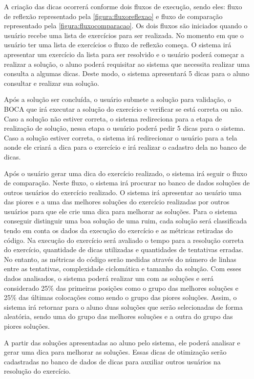 A criação das dicas ocorrerá conforme dois fluxos de execução, sendo eles: fluxo de reflexão representado pela \cref{figura:fluxoreflexao} e fluxo de comparação representado pela \cref{figura:fluxocomparacao}. Os dois fluxos são iniciados quando o usuário recebe uma lista de exercícios para ser realizada. No momento em que o usuário ter uma lista de exercícios o fluxo de reflexão começa. O sistema irá apresentar um exercício da lista para ser resolvido e o usuário poderá começar a realizar a solução, o aluno poderá requisitar ao sistema que necessita realizar uma consulta a algumas dicas. Deste modo, o sistema apresentará 5 dicas para o aluno consultar e realizar sua solução.

Após a solução ser concluída, o usuário submete a solução para validação, o BOCA que irá executar a solução do exercício e verificar se está correta ou não. Caso a solução não estiver correta, o sistema redireciona para a etapa de realização de solução, nessa etapa o usuário poderá pedir 5 dicas para o sistema. Caso a solução estiver correta, o sistema irá redirecionar o usuário para a tela aonde ele criará a dica para o exercício e irá realizar o cadastro dela no banco de dicas.

Após o usuário gerar uma dica do exercício realizado, o sistema irá seguir o fluxo de comparação. Neste fluxo, o sistema irá procurar no banco de dados soluções de outros usuários do exercício realizado. O sistema irá apresentar ao usuário uma das piores e a uma das melhores soluções do exercício realizadas por outros usuários para que ele crie uma dica para melhorar as soluções. Para o sistema conseguir distinguir uma boa solução de uma ruim, cada solução será classificada tendo em conta os dados da execução do exercício e as métricas retiradas do código. Na execução do exercício será avaliado o tempo para a resolução correta do exercício, quantidade de dicas utilizadas e quantidades de tentativas erradas. No entanto, as métricas do código serão medidas através do número de linhas entre as tentativas, complexidade ciclomática e tamanho da solução. Com esses dados analisados, o sistema poderá realizar um  com as soluções e será considerado 25\% das primeiras posições como o grupo das melhores soluções e 25\% das últimas colocações como sendo o grupo das piores soluções. Assim, o sistema irá retornar para o aluno duas soluções que serão selecionadas de forma aleatória, sendo uma do grupo das melhores soluções e a outra do grupo das piores soluções.

A partir das soluções apresentadas ao aluno pelo sistema, ele poderá analisar e gerar uma dica para melhorar as soluções. Essas dicas de otimização serão cadastradas no banco de dados de dicas para auxiliar outros usuários na resolução do exercício.

